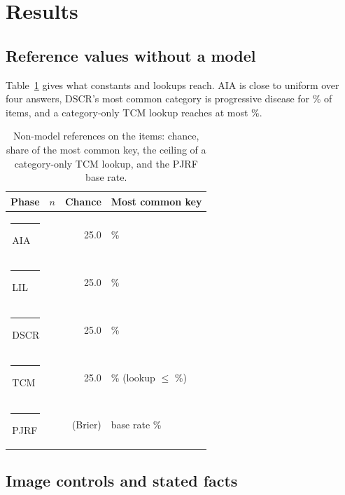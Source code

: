 \documentclass[conference]{IEEEtran}
\newcommand{\hdrrow}{\rowcolor{tblhdr}}
\newcommand{\bandrow}{\rowcolor{tblband}}
\newcommand{\ptag}[2]{\textcolor{#1}{\rule[0.02em]{0.72em}{0.72em}}\,#2}
\newcommand{\ptagAIA}{\ptag{aiacol}{AIA}}
\newcommand{\ptagLIL}{\ptag{lilcol}{LIL}}
\newcommand{\ptagDSCR}{\ptag{dscrcol}{DSCR}}
\newcommand{\ptagPJRF}{\ptag{pjrfcol}{PJRF}}
\newcommand{\ptagTCM}{\ptag{tcmcol}{TCM}}
\begin{document}
\section{Results}
\label{sec:results}

\subsection{Reference values without a model}

Table~\ref{tab:baselines} gives what constants and lookups reach. AIA is close to uniform over four answers, DSCR's most common category is progressive disease for \vfourMajorityDSCR{}\% of items, and a category-only TCM lookup reaches at most \vfourTcmLookupEsc{}\%.

\begin{table}[t]
\centering
\footnotesize
\setlength{\tabcolsep}{3pt}
\begin{tabular}{lrrl}
\toprule
\hdrrow Phase & $n$ & Chance & Most common key \\
\midrule
\ptagAIA & \vfourNAIA{} & 25.0 & \vfourMajorityAIA{}\% \\
\bandrow \ptagLIL & \vfourNLIL{} & 25.0 & \vfourMajorityLIL{}\% \\
\ptagDSCR & \vfourNDSCR{} & 25.0 & \vfourMajorityDSCR{}\% \\
\bandrow \ptagTCM & \vfourNTCM{} & 25.0 & \vfourMajorityTCM{}\% (lookup $\le$ \vfourTcmLookupEsc{}\%) \\
\ptagPJRF & \vfourNPJRF{} & (Brier) & base rate \vfourPjrfBase{}\% \\
\bottomrule
\end{tabular}
\caption{Non-model references on the items: chance, share of the most common key, the ceiling of a category-only TCM lookup, and the PJRF base rate.}
\label{tab:baselines}
\end{table}

\subsection{Image controls and stated facts}

\begin{table}[t]
\centering
\scriptsize
\setlength{\tabcolsep}{2pt}

\caption{E1: accuracy (\%) with the image and text only (no upstream context), the paired difference in points with its bootstrap interval, an add-half sparse-data interval (Add-half CI), the exact McNemar $p$ (unadjusted), the share of items whose answer differs between the two arms (answers differ), and the interval reading. The interval reading is descriptive; Holm-corrected exact McNemar tests determine confirmatory significance (only Llama-4-Scout on DSCR survives). Gemma-3-27B gives a constant class in both DSCR arms, so its within-margin label rests on the add-half interval. Answers-differ is over items in all three arms (AIA 46, LIL 38, DSCR 42 of 46); accuracy is over all items per phase (AIA 46, LIL 38, DSCR 46). AIA is the positive control.}
\label{tab:e1}
\end{table}
\end{document}
